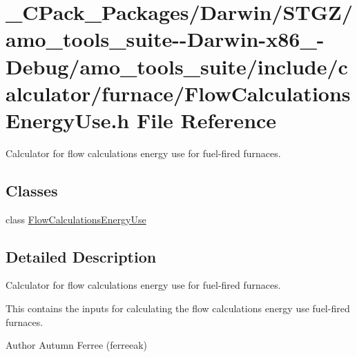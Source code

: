 \hypertarget{___c_pack___packages_2_darwin_2_s_t_g_z_2amo__tools__suite--_darwin-x86__64-_debug_2amo__tools__6e959afd0519a9e21dc07e675a11bcdd}{}\section{\+\_\+\+C\+Pack\+\_\+\+Packages/\+Darwin/\+S\+T\+G\+Z/amo\+\_\+tools\+\_\+suite-\/-\/\+Darwin-\/x86\+\_-\/\+Debug/amo\+\_\+tools\+\_\+suite/include/calculator/furnace/\+Flow\+Calculations\+Energy\+Use.h File Reference}
\label{___c_pack___packages_2_darwin_2_s_t_g_z_2amo__tools__suite--_darwin-x86__64-_debug_2amo__tools__6e959afd0519a9e21dc07e675a11bcdd}


Calculator for flow calculations energy use for fuel-\/fired furnaces.  


\subsection*{Classes}
\begin{DoxyCompactItemize}
\item 
class \hyperlink{class_flow_calculations_energy_use}{Flow\+Calculations\+Energy\+Use}
\end{DoxyCompactItemize}


\subsection{Detailed Description}
Calculator for flow calculations energy use for fuel-\/fired furnaces. 

This contains the inputs for calculating the flow calculations energy use fuel-\/fired furnaces.

\begin{DoxyAuthor}{Author}
Autumn Ferree (ferreeak) 
\end{DoxyAuthor}
